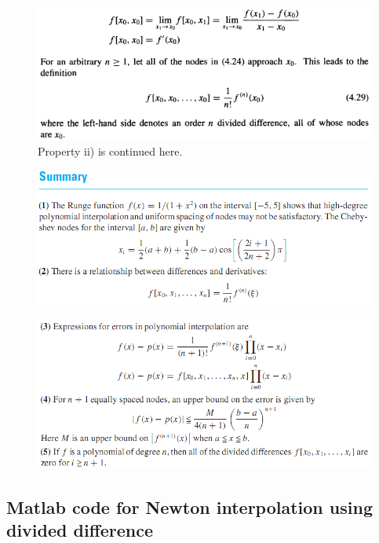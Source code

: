 \documentclass[12pt]{article}
\theoremstyle{theorem}
\begin{document}
\begin{figure}[h!]
	\centering
	\includegraphics[scale = 0.8]{Figures/26}
	\caption{Property ii) is continued here.}
\end{figure}

\begin{figure}[h!]
	\centering
	\includegraphics[scale = 0.85]{Figures/19}
\end{figure}

\begin{figure}[h!]
	\centering
	\includegraphics[scale = 0.85]{Figures/20}
\end{figure}

\subsection{Matlab code for Newton interpolation using divided difference}
\end{document}

